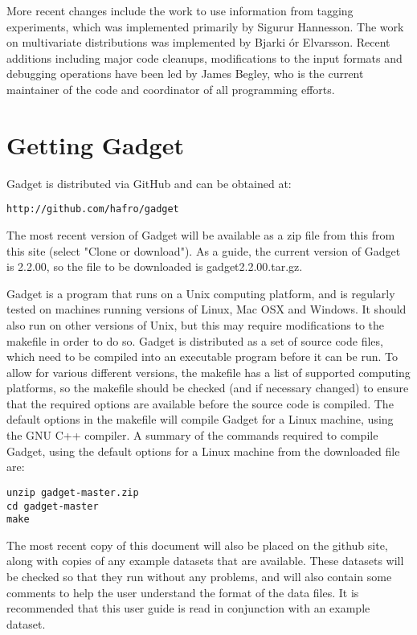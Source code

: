 \documentclass[10pt,twoside]{book}
\begin{document}
\bigskip
More recent changes include the work to use information from tagging experiments, which was implemented primarily by Sigur{\dh}ur Hannesson.  The work on multivariate distributions was implemented by Bjarki {\TH}\'{o}r Elvarsson.  Recent additions including major code cleanups, modifications to the input formats and debugging operations have been led by James Begley, who is the current maintainer of the code and coordinator of all programming efforts.

\section{Getting Gadget}\label{sec:gettinggadget}
Gadget is distributed via GitHub and can be obtained at:

{\small\begin{verbatim}
http://github.com/hafro/gadget
\end{verbatim}}

The most recent version of Gadget will be available as a zip file from
this from this site (select "Clone or download"). As a guide, the
current version of Gadget is 2.2.00, so the file to be downloaded is
gadget2.2.00.tar.gz.

\bigskip Gadget is a program that runs on a Unix computing platform,
and is regularly tested on machines running versions of Linux, Mac OSX
and Windows.  It should also run on other versions of Unix, but this
may require modifications to the makefile in order to do so.  Gadget
is distributed as a set of source code files, which need to be
compiled into an executable program before it can be run.  To allow
for various different versions, the makefile has a list of supported
computing platforms, so the makefile should be checked (and if
necessary changed) to ensure that the required options are available
before the source code is compiled.  The default options in the
makefile will compile Gadget for a Linux machine, using the GNU C++
compiler.  A summary of the commands required to compile Gadget, using
the default options for a Linux machine from the downloaded file are:

{\small\begin{verbatim}
unzip gadget-master.zip
cd gadget-master
make
\end{verbatim}}

The most recent copy of this document will also be placed on the
github site, along with copies of any example datasets that are
available.  These datasets will be checked so that they run without
any problems, and will also contain some comments to help the user
understand the format of the data files.  It is recommended that this
user guide is read in conjunction with an example dataset.
\end{document}

